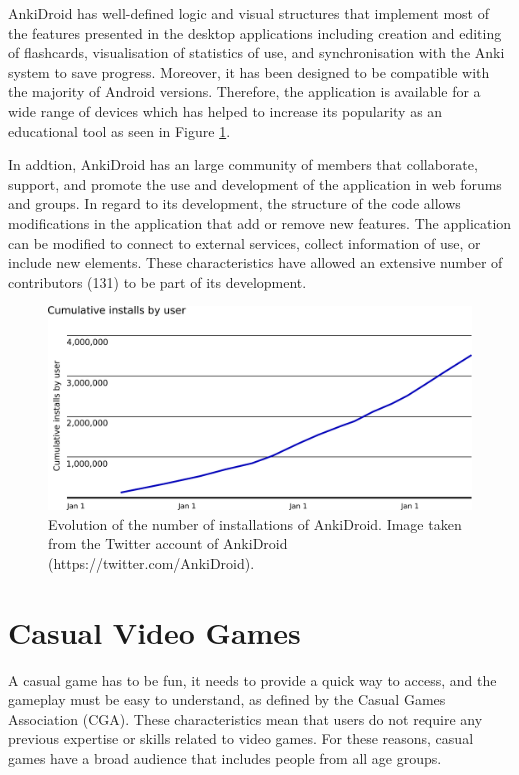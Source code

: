AnkiDroid has well-defined logic and visual structures \citep{zamora2011ankidroid} that implement most of the features presented in the desktop applications including creation and editing of flashcards, visualisation of statistics of use, and synchronisation with the Anki system to save progress. Moreover, it has been designed to be compatible with the majority of Android versions. Therefore, the application is available for a wide range of devices which has helped to increase its popularity as an educational tool as seen in Figure \ref{fig:anki-evolution}.

In addtion, AnkiDroid has an large community of members that collaborate, support, and promote the use and development of the application in web forums and groups. In regard to its development, the structure of the code allows modifications in the application that add or remove new features. The application can be modified to connect to external services, collect information of use, or include new elements. These characteristics have allowed an extensive number of contributors (131) to be part of its development.

\begin{figure}[htb]
    \vskip 5mm
        \begin{center}
            \includegraphics[scale=0.4]{./Figures/anki_progress.png}
            \caption[Evolution of the number of installations of AnkiDroid]{Evolution of the number of installations of AnkiDroid. Image taken from the Twitter account of AnkiDroid (https://twitter.com/AnkiDroid).}
            \label{fig:anki-evolution}
        \end{center}
    \vskip -5mm
\end{figure}


\section{Casual Video Games}
A casual game has to be fun, it needs to provide a quick way to access, and the gameplay must be easy to understand, as defined by the Casual Games Association (CGA). These characteristics mean that users do not require any previous expertise or skills related to video games. For these reasons, casual games have a broad audience that includes people from all age groups.

